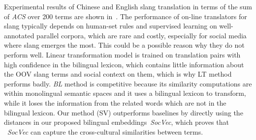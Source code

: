Experimental results of Chinese and English slang translation in terms of the sum of \textit{ACS} over 200 terms are shown in~.
The performance of on-line translators for slang typically depends on human-set rules and supervised learning on well-annotated parallel corpora, which are rare and costly, especially for social media where slang emerges the most. This could be a possible reason why they do not perform well. 
Linear transformation model is trained on translation pairs with high confidence in the bilingual lexicon, which contains little information about the OOV slang terms and social context on them, which is why LT method performs badly.
\textit{BL} method is competitive because its similarity computations 
are within monolingual semantic spaces and it uses a bilingual lexicon 
to transform, while it loses the information from the related words 
which are not in the bilingual lexicon.
Our method (SV) outperforms baselines by directly using the distances in 
our proposed bilingual embeddings~\textit{SocVec}, which proves 
that ~\textit{SocVec} can capture the cross-cultural similarities between terms.


